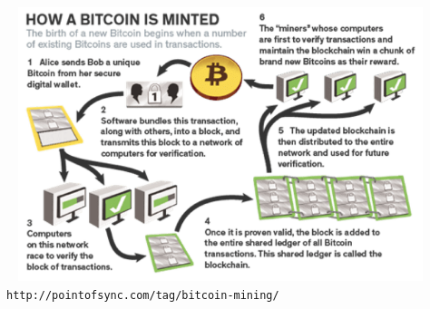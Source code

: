 

\begin{frame}{}

\begin{columns}
\column{\dimexpr\paperwidth-1pt}

\begin{center}
\vskip 0.7cm
\includegraphics[width=12.5cm,height=8.0cm]{graphics/bitcoin-mining-process-graphic-overview.png}
\vskip -0.4cm
{\tiny\texttt{http://pointofsync.com/tag/bitcoin-mining/}}
\end{center}

\end{columns}

\normalsize
\end{frame}

